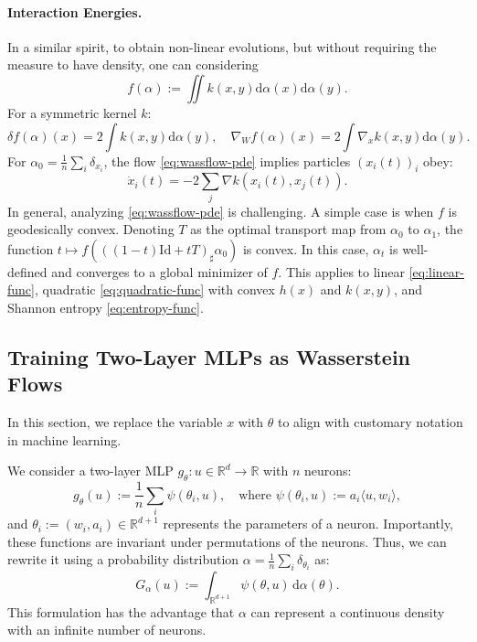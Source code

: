 \paragraph{Interaction Energies.} In a similar spirit, to obtain non-linear evolutions, but without requiring the measure to have density, one can considering
   \begin{equation}
       f(\alpha) := \iint k(x, y) \mathrm{d} \alpha(x) \mathrm{d} \alpha(y). \label{eq:quadratic-func}
   \end{equation}
   For a symmetric kernel $k$:
   \begin{equation}
       \delta f(\alpha)(x) = 2 \int k(x, y) \mathrm{d} \alpha(y), \quad \nabla_W f(\alpha)(x) = 2 \int \nabla_x k(x, y) \mathrm{d} \alpha(y).
   \end{equation}
   For $\alpha_0 = \frac{1}{n} \sum_i \delta_{x_i}$, the flow \eqref{eq:wassflow-pde} implies particles $(x_i(t))_i$ obey:
   \begin{equation}
       \dot{x}_i(t) = -2 \sum_j \nabla k(x_i(t), x_j(t)).
   \end{equation}
In general, analyzing \eqref{eq:wassflow-pde} is challenging. A simple case is when $f$ is geodesically convex. Denoting $T$ as the optimal transport map from $\alpha_0$ to $\alpha_1$, the function $t \mapsto f(((1-t)\mathrm{Id} + tT)_\sharp \alpha_0)$ is convex. In this case, $\alpha_t$ is well-defined and converges to a global minimizer of $f$. This applies to linear \eqref{eq:linear-func}, quadratic \eqref{eq:quadratic-func} with convex $h(x)$ and $k(x, y)$, and Shannon entropy \eqref{eq:entropy-func}.

\subsection{Training Two-Layer MLPs as Wasserstein Flows}

In this section, we replace the variable $x$ with $\theta$ to align with customary notation in machine learning.

We consider a two-layer MLP $g_\theta : u \in \mathbb{R}^d \to \mathbb{R}$ with $n$ neurons:
\begin{equation}
    g_\theta(u) := \frac{1}{n} \sum_i \psi(\theta_i, u), \quad \text{where } \psi(\theta_i, u) := a_i \langle u, w_i \rangle,
\end{equation}
and $\theta_i := (w_i, a_i) \in \mathbb{R}^{d+1}$ represents the parameters of a neuron. Importantly, these functions are invariant under permutations of the neurons. Thus, we can rewrite it using a probability distribution $\alpha = \frac{1}{n} \sum_i \delta_{\theta_i}$ as:
\begin{equation}
    G_\alpha(u) := \int_{\mathbb{R}^{d+1}} \psi(\theta, u) \, \mathrm{d} \alpha(\theta).
\end{equation}
This formulation has the advantage that $\alpha$ can represent a continuous density with an infinite number of neurons.

